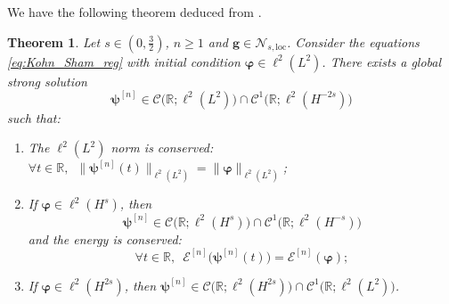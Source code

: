\documentclass[12pt,a4paper]{amsart}
\newtheorem{theorem}{Theorem}[section]
\numberwithin{equation}{section}
\newcommand{\ulg}{\boldsymbol{g}}
\newcommand{\ulpsi}{\boldsymbol{\psi}}
\newcommand{\ulphi}{\boldsymbol{\varphi}}
\newcommand{\Nloc}{\mathscr{N}_{s,\mathrm{loc}}}
\begin{document}
	
	We have the following theorem deduced from \cite[Theorem 3.3.1]{cazenave2003semilinear}.
	\begin{theorem}\label{thm:existence_regularized}
		Let $s\in(0,\frac32)$, $n \geq 1$ and $\ulg\in\Nloc$. Consider the equations \eqref{eq:Kohn_Sham_reg} with initial condition $ \ulphi  \in \ell^2(L^2) $. There exists a global strong solution
		\[
		\ulpsi^{[n]} \in \mathscr{C}\big(\mathbb{R};\ell^2(L^2)\big) \cap \mathscr{C}^1 \big(\mathbb{R};\ell^2(H^{-2s})\big)
		\]
		such that:
		\begin{enumerate}[label=\roman*)]
			\item The $ \ell^2(L^2) $ norm is conserved: $ \forall t \in \mathbb{R},\;\ \| \ulpsi^{[n]}(t) \|_{\ell^2(L^2)} = \| \ulphi  \|_{\ell^2(L^2)} $;
			\item \label{it:cons_en} If $ \ulphi  \in \ell^2(H^{s}) $, then %
			\begin{equation*}
				\ulpsi^{[n]} \in \mathscr{C}\big(\mathbb{R};\ell^2(H^{s})\big) \cap \mathscr{C}^1\big(\mathbb{R};\ell^2(H^{-s})\big)
			\end{equation*}
			and the energy is conserved: 
			\[ \forall t \in \mathbb{R}, \;\ \mathcal{E}^{[n]}\big(\ulpsi^{[n]}(t)\big) = \mathcal{E}^{[n]}(\ulphi ) ; \]
			\item If $ \ulphi  \in \ell^2(H^{2s}) $, then $ \ulpsi^{[n]} \in \mathscr{C}\big(\mathbb{R};\ell^2(H^{2s})\big) \cap \mathscr{C}^1\big(\mathbb{R};\ell^2(L^2)\big) $.
		\end{enumerate}
	\end{theorem}
\end{document}
